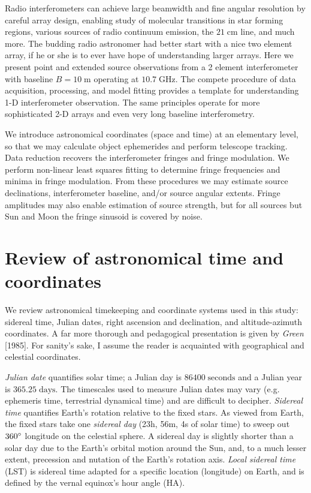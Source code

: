 \documentclass[10pt]{article}
\newcommand {\mt}{\mathrm}
\newcommand {\unit}[1]{\; \mt{#1}}
\begin{document}
Radio interferometers can achieve large beamwidth and fine angular resolution by careful array design, enabling study of molecular transitions in star forming regions, various sources of radio continuum emission, the $21 \unit{cm}$ line, and much more.  The budding radio astronomer had better start with a nice two element array, if he or she is to ever have hope of understanding larger arrays.  Here we present point and extended source observations from a 2 element interferometer with baseline $B=10\unit{m}$ operating at $10.7\unit{GHz}$.  The compete procedure of data acquisition, processing, and model fitting provides a template for understanding 1-D interferometer observation.  The same principles operate for more sophisticated 2-D arrays and even very long baseline interferometry.

We introduce astronomical coordinates (space and time) at an elementary level, so that we may calculate object ephemerides and perform telescope tracking.  Data reduction recovers the interferometer fringes and fringe modulation.  We perform non-linear least squares fitting to determine fringe frequencies and minima in fringe modulation.  From these procedures we may estimate source declinations, interferometer baseline, and/or source angular extents.  Fringe amplitudes may also enable estimation of source strength, but for all sources but Sun and Moon the fringe sinusoid is covered by noise.

\section{Review of astronomical time and coordinates}

We review astronomical timekeeping and coordinate systems used in this study: sidereal time, Julian dates, right ascension and declination, and altitude-azimuth coordinates.
A far more thorough and pedagogical presentation is given by \textit{Green} [1985].
For sanity's sake, I assume the reader is acquainted with geographical and celestial coordinates.

\emph{Julian date} quantifies solar time; a Julian day is $86400 \unit{seconds}$ and a Julian year is $365.25 \unit{days}$.
The timescales used to measure Julian dates may vary (e.g. ephemeris time, terrestrial dynamical time) and are difficult to decipher.
\emph{Sidereal time} quantifies Earth's rotation relative to the fixed stars.
As viewed from Earth, the fixed stars take one \emph{sidereal day} (23h, 56m, 4s of solar time) to sweep out $360\degree$ longitude on the celestial sphere.
A sidereal day is slightly shorter than a solar day due to the Earth's orbital motion around the Sun, and, to a much lesser extent, precession and nutation of the Earth's rotation axis.
\emph{Local sidereal time} (LST) is sidereal time adapted for a specific location (longitude) on Earth, and is defined by the vernal equinox's hour angle (HA).
\end{document}
